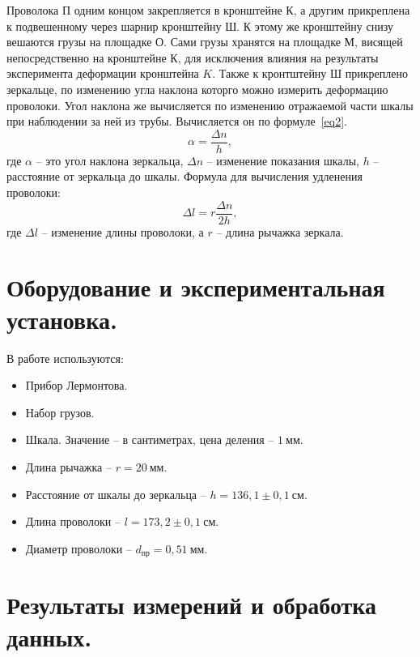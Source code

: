 \documentclass[a4paper,11pt]{article}
\begin{document}
Проволока $П$ одним концом закрепляется в кронштейне $К$, а другим прикреплена к подвешенному через шарнир кронштейну $Ш$. К этому же кронштейну снизу вешаются грузы на площадке $О$. Сами грузы хранятся на площадке $М$, висящей непосредственно на кронштейне $К$, для исключения влияния на результаты эксперимента деформации кронштейна $K$. Также к кронтштейну $Ш$ прикреплено зеркальце, по изменению угла наклона которго можно измерить деформацию проволоки. Угол наклона же вычисляется по изменению отражаемой части шкалы при наблюдении за ней из трубы. Вычисляется он по формуле~\ref{eq2}.
\begin{equation}    \label{eq2}
  \alpha = \frac{\Delta n}{h},
\end{equation}
где $\alpha$ -- это угол наклона зеркальца, $\Delta n$ -- изменение показания шкалы, $h$ -- расстояние от зеркальца до шкалы.
Формула для вычисления удленения проволоки:
\begin{equation}    \label{eq3}
  \Delta l = r \frac{\Delta n}{2h},
\end{equation}
где $\Delta l$ -- изменение длины проволоки, а $r$ -- длина рычажка зеркала.
\section{Оборудование и экспериментальная установка.}
В работе используются:
\begin{itemize}
  \item Прибор Лермонтова.
  \item Набор грузов.
  \item Шкала. Значение -- в сантиметрах, цена деления -- $1\ мм$.
  \item Длина рычажка -- $r = 20\ мм$.
  \item Расстояние от шкалы до зеркальца -- $h = 136,1 \pm 0,1\ см$.
  \item Длина проволоки -- $l = 173,2 \pm 0,1\ см$.
  \item Диаметр проволоки -- $d_{пр} = 0,51\ мм$.
\end{itemize}
\section{Результаты измерений и обработка данных.}
\end{document}
